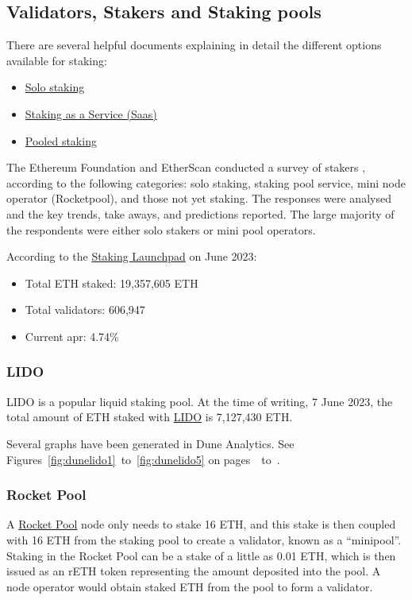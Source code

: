 \documentclass[UTF8]{article}
\begin{document}
\subsection{Validators, Stakers and Staking pools}
\label{sec:stakers}
There are several helpful documents explaining in detail the different options available for staking:
\begin{itemize}
\item \href{https://ethereum.org/en/staking/solo/}{Solo staking}
\item \href{https://ethereum.org/en/staking/saas/}{Staking as a Service (Saas)}
\item \href{https://ethereum.org/en/staking/pools/}{Pooled staking}
\end{itemize}

The Ethereum Foundation and EtherScan conducted a survey of stakers \cite{Smith2023}, according to the following categories: solo staking, staking pool service, mini node operator (Rocketpool), and those not yet staking. The responses were analysed and the key trends, take aways, and predictions reported. The large majority of the respondents were either solo stakers or mini pool operators.


According to the \href{https://launchpad.ethereum.org/en/}{Staking Launchpad} on June 2023:
\begin{itemize}
\item Total ETH staked: 19,357,605 ETH
\item Total validators: 606,947
\item Current \gls{apr}: 4.74\%
\end{itemize}

\subsubsection*{LIDO}
LIDO is a popular liquid staking pool. 
At the time of writing, 7 June 2023, the total amount of ETH staked with \href{https://lido.fi/ethereum}{LIDO}  is 7,127,430 ETH. 

Several graphs have been generated in Dune Analytics. See Figures~\ref{fig:dunelido1}~to~\ref{fig:dunelido5} on pages~\pageref{fig:dunelido1}~to~\pageref{fig:dunelido5}.


\subsubsection*{Rocket Pool}
A \href{https://rocketpool.net/}{Rocket Pool} node only needs to stake 16 ETH, and this stake is then coupled with 16 ETH from the staking pool to create a validator, known as a ``minipool''.  Staking in the Rocket Pool can be a stake of a little as 0.01 ETH, which is then issued as an rETH token representing the amount deposited into the pool. A node operator would obtain staked ETH from the pool to form a validator.
\end{document}
